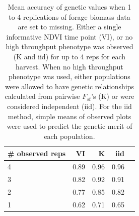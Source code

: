 \documentclass[12pt, letterpaper]{article}
\begin{document}
\begin{table}[ht]
\caption{Mean accuracy of genetic values when 1 to 4 replications of forage biomass data are set to missing. Either a single informative NDVI time point (VI), or no high throughput phenotype was observed (K and iid) for up to 4 reps for each harvest. When no high throughput phenotype was used, either populations were allowed to have genetic relationships calculated from pairwise $F_{st}$'s (K) or were considered independent (iid). For the iid method, simple means of observed plots were used to predict the genetic merit of each population.}

\centering
\begin{tabular*}{\hsize}{@{\extracolsep{\fill}}lrrrr}
  \hline
 \# observed reps & VI & K & iid \\ 
  \hline
  4 & 0.89 & 0.96 & 0.96 \\ 
  3 & 0.82 & 0.92 & 0.91 \\ 
  2 & 0.77 & 0.85 & 0.82 \\ 
  1 & 0.62 & 0.71 & 0.65 \\ 
   \hline
\end{tabular*}
\label{predRepsMean}
\end{table}
\end{document}
